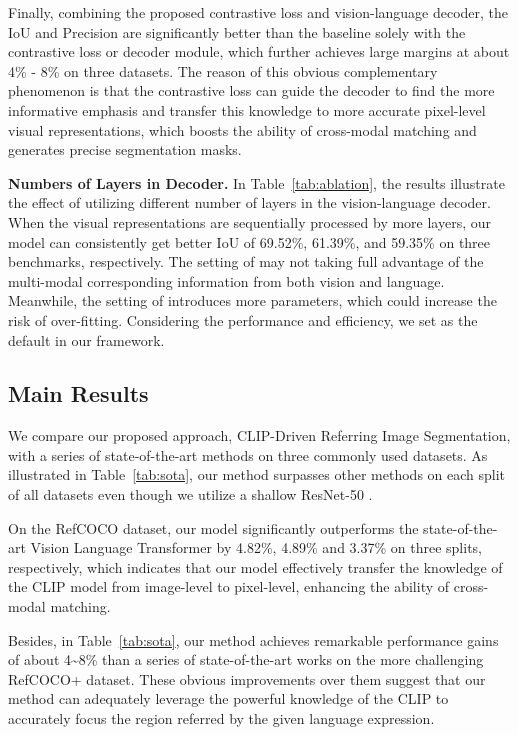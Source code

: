 \documentclass[10pt,twocolumn,letterpaper]{article}
\begin{document}
Finally, combining the proposed contrastive loss and vision-language decoder, the IoU and Precision are significantly better than the baseline solely with the contrastive loss or decoder module, which further achieves large margins at about 4\% - 8\% on three datasets.
The reason of this obvious complementary phenomenon is that the contrastive loss can guide the decoder to find the more informative emphasis and transfer this knowledge to more accurate pixel-level visual representations, which boosts the ability of cross-modal matching and generates precise segmentation masks.

\textbf{Numbers of Layers in Decoder.}
In Table~\ref{tab:ablation}, the results illustrate the effect of utilizing different number of layers in the vision-language decoder.
When the visual representations are sequentially processed by more layers, our model can consistently get better IoU of 69.52\%, 61.39\%, and 59.35\% on three benchmarks, respectively.
The setting of  may not taking full advantage of the multi-modal corresponding information from both vision and language.
Meanwhile, the setting of  introduces more parameters, which could increase the risk of over-fitting.
Considering the performance and efficiency, we set  as the default in our framework.

\subsection{Main Results}
We compare our proposed approach, CLIP-Driven Referring Image Segmentation, with a series of state-of-the-art methods on three commonly used datasets.
As illustrated in Table~\ref{tab:sota}, our method surpasses other methods on each split of all datasets even though we utilize a shallow ResNet-50 \cite{he2016deep}.

On the RefCOCO dataset, our model significantly outperforms the state-of-the-art Vision Language Transformer \cite{ding2021vlt} by 4.82\%, 4.89\% and 3.37\% on three splits, respectively, which indicates that our model effectively transfer the knowledge of the CLIP model from image-level to pixel-level, enhancing the ability of cross-modal matching.

Besides, in Table~\ref{tab:sota}, our method achieves remarkable performance gains of about 4\textasciitilde8\% than a series of state-of-the-art works on the more challenging RefCOCO+ dataset.
These obvious improvements over them suggest that our method can adequately leverage the powerful knowledge of the CLIP to accurately focus the region referred by the given language expression.
\end{document}
